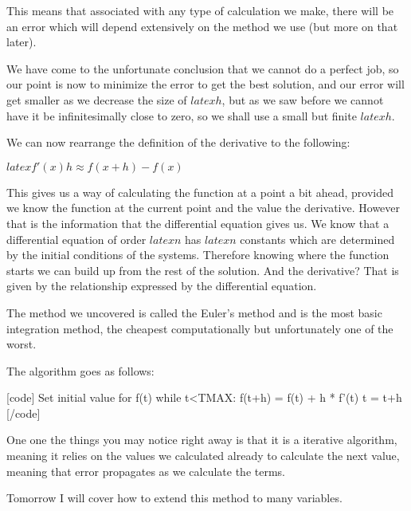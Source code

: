 This means that associated with any type of calculation we make, there will be an error which will depend extensively on the method we use (but more on that later).

We have come to the unfortunate conclusion that we cannot do a perfect job, so our point is now to minimize the error to get the best solution, and our error will get smaller as we decrease the size of $latex h$, but as we saw before we cannot have it be infinitesimally close to zero, so we shall use a small but finite $latex h$.

We can now rearrange the definition of the derivative to the following:

$latex f'(x) h \approx f(x+h) - f(x)$

This gives us a way of calculating the function at a point a bit ahead, provided we know the function at the current point and the value the derivative. However that is the information that the differential equation gives us. We know that a differential equation of order $latex n$ has $latex n$ constants which are determined by the initial conditions of the systems. Therefore knowing where the function starts we can build up from the rest of the solution. And the derivative? That is given by the relationship expressed by the differential equation.

The method we uncovered is called the Euler's method and is the most basic integration method, the cheapest computationally but unfortunately one of the worst.

The algorithm goes as follows:

[code]
Set initial value for f(t)
while t<TMAX:
    f(t+h) = f(t) + h * f'(t)
    t = t+h
[/code]

One one the things you may notice right away is that it is a iterative algorithm, meaning it relies on the values we calculated already to calculate the next value, meaning that error propagates as we calculate the terms.

Tomorrow I will cover how to extend this method to many variables.